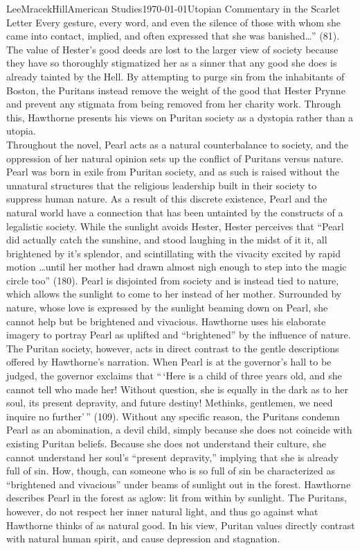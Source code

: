 \documentclass[12pt, letterpaper]{article}
\begin{document}
\begin{mla}{Lee}{Mracek}{Hill}{American Studies}{\today}{Utopian Commentary in the Scarlet Letter}
        Every gesture, every word, and even the silence of those with whom she came into contact, implied, and often expressed that she was banished\ldots'' (81). The value of Hester's good deeds are lost to the larger view of society because they have so thoroughly stigmatized her as a sinner that any good she does is already tainted by the Hell. By attempting to purge sin from the inhabitants of Boston, the Puritans instead remove the weight of the good that Hester Prynne  and prevent any stigmata from being removed from her charity work. Through this, Hawthorne presents his views on Puritan society as a dystopia rather than a utopia. \\
        Throughout the novel, Pearl acts as a natural counterbalance to society, and the oppression of her natural opinion sets up the conflict of Puritans versus nature. Pearl was born in exile from Puritan society, and as such is raised without the unnatural structures that the religious leadership built in their society to suppress human nature. As a result of this discrete existence, Pearl and the natural world have a connection that has been untainted by the constructs of a legalistic society. While the sunlight avoids Hester, Hester perceives that ``Pearl did actually catch the sunshine, and stood laughing in the midst of it it, all brightened by it's splendor, and scintillating with the vivacity excited by rapid motion \ldots until her mother had drawn almost nigh enough to step into the magic circle too'' (180). Pearl is disjointed from society and is instead tied to nature, which allows the sunlight to come to her instead of her mother. Surrounded by nature, whose love is expressed by the sunlight beaming down on Pearl, she cannot help but be brightened and vivacious. Hawthorne uses his elaborate imagery to portray Pearl as uplifted and ``brightened'' by the influence of nature. The Puritan society, however, acts in direct contrast to the gentle descriptions offered by Hawthorne's narration. When Pearl is at the governor's hall to be judged, the governor exclaims that ``\,`Here is a child of three years old, and she cannot tell who made her! Without question, she is equally in the dark as to her soul, its present depravity, and future destiny! Methinks, gentlemen, we need inquire no further'\,'' (109). Without any specific reason, the Puritans condemn Pearl as an abomination, a devil child, simply because she does not coincide with existing Puritan beliefs. Because she does not understand their culture, she cannot understand her soul's ``present depravity,'' implying that she is already full of sin. How, though, can someone who is so full of sin be characterized as ``brightened and vivacious'' under beams of sunlight out in the forest. Hawthorne describes Pearl in the forest as aglow: lit from within by sunlight. The Puritans, however, do not respect her inner natural light, and thus go against what Hawthorne thinks of as natural good. In his view, Puritan values directly contrast with natural human spirit, and cause depression and stagnation.

\end{mla}
\end{document}
